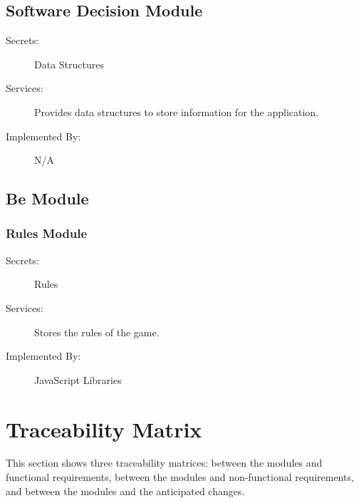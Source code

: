 \documentclass[12pt, titlepage]{article}
\begin{document}
\subsection{Software Decision Module}

\begin{description}
\item[Secrets:] Data Structures
\item[Services:] Provides data structures to store information for the application.
\item[Implemented By:] N/A
\end{description}

\subsection{Be Module}
\subsubsection{Rules Module}

\begin{description}
\item[Secrets:] Rules
\item[Services:] Stores the rules of the game.
\item[Implemented By:] JavaScript Libraries
\end{description}

\section{Traceability Matrix} \label{SecTM}

This section shows three traceability matrices: between the modules and functional requirements, between the modules and non-functional requirements, and between the modules and the anticipated changes.
\end{document}
